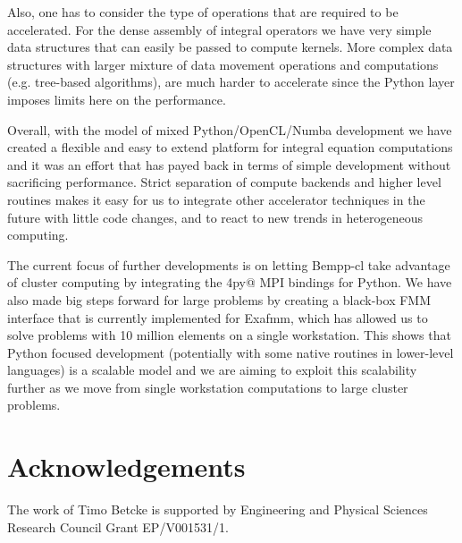 Also, one has to consider the type of operations that are required to be accelerated. For the dense assembly of integral operators we have very simple data structures that can easily be passed to compute kernels. More complex data structures with larger mixture of data movement operations and computations (e.g. tree-based algorithms), are much harder to accelerate since the Python layer imposes limits here on the performance.

Overall, with the model of mixed Python/OpenCL/Numba development we have created a flexible and easy to extend platform for integral equation computations and it was an effort that has payed back in terms of simple development without sacrificing performance. Strict separation of compute backends and higher level routines makes it easy for us to integrate other accelerator techniques in the future with little code changes, and to react to new trends in heterogeneous computing.

The current focus of further developments is on letting Bempp-cl take advantage of cluster computing by integrating the \verb@mpi4py@ MPI bindings for Python. We have also made big steps forward for large problems by creating a black-box FMM interface that is currently implemented for Exafmm, which has allowed us to solve problems with 10 million elements on a single workstation. This shows that Python focused development (potentially with some native routines in lower-level languages) is a scalable model and we are aiming to exploit this scalability further as we move from single workstation computations to large cluster problems.

\section{Acknowledgements}
The work of Timo Betcke is supported by Engineering and Physical Sciences Research Council Grant EP/V001531/1.